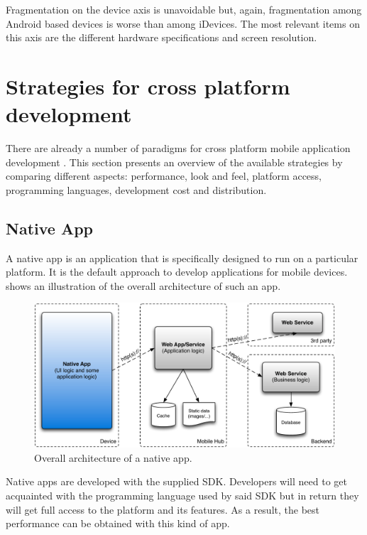 \npar Fragmentation on the device axis is unavoidable but, again, fragmentation among Android based devices is worse than among iDevices. The most relevant items on this axis are the different hardware specifications and screen resolution.

\npar 

\section{Strategies for cross platform development}

\npar There are already a number of paradigms for cross platform mobile application development \citep{Friese}. This section presents an overview of the available strategies by comparing different aspects: performance, look and feel, platform access, programming languages, development cost and distribution.

\subsection{Native App}

\npar A native app is an application that is specifically designed to run on a particular platform. It is the default approach to develop applications for mobile devices.  shows an illustration of the overall architecture of such an app. 

\begin{figure}
    \begin{center}
        \includegraphics[width=\textwidth]{figs/native.pdf}
        \caption{
            Overall architecture of a native app. 
        }
        \label{fig:native}
    \end{center}
\end{figure}

\npar Native apps are developed with the supplied SDK. Developers will need to get acquainted with the programming language used by said SDK but in return they will get full access to the platform and its features. As a result, the best performance can be obtained with this kind of app.

